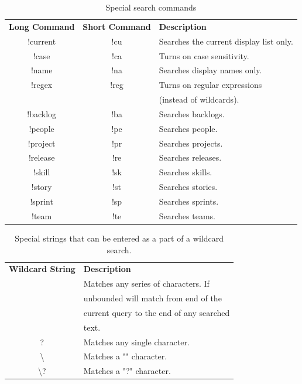 \begin{table}[h]
\centering
\caption{Special search commands}
\label{fig:search_commands}
\begin{tabular}{|c|c|l|}
{\bf Long Command} & {\bf Short Command} & {\bf Description}                                    \\
!current           & !cu                 & Searches the current display list only.              \\
!case              & !ca                 & Turns on case sensitivity.                           \\
!name              & !na                 & Searches display names only.                         \\
!regex             & !reg                & Turns on regular expressions \\
                   &                     &(instead of wildcards). \\
!backlog           & !ba                 & Searches backlogs.                                   \\
!people            & !pe                 & Searches people.                                     \\
!project           & !pr                 & Searches projects.                                   \\
!release           & !re                 & Searches releases.                                   \\
!skill             & !sk                 & Searches skills.                                     \\
!story             & !st                 & Searches stories.                                    \\
!sprint            & !sp                 & Searches sprints.                                    \\
!team              & !te                 & Searches teams.                                     
\end{tabular}
\end{table}

\begin{table}[H]
\centering
\caption{Special strings that can be entered as a part of a wildcard search.}
\label{fig:wildcard_commands}
\begin{tabular}{|c|l|}
{\bf Wildcard String} & {\bf Description} \\
\text{*}  &   Matches any series of characters. If \\
    &   unbounded will match from end of the \\
    &   current query to the end of any searched\\
    &   text.\\
?   &   Matches any single character.\\
\textbackslash \text{*} &   Matches a "\text{*}" character.\\
\textbackslash ? &   Matches a "?" character.
\end{tabular}
\end{table}

